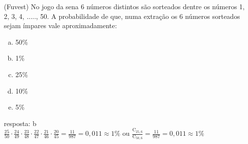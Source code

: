 \begin{ex}
 (Fuvest) No jogo da sena 6 números distintos são sorteados dentre os números 1, 2, 3, 4, ....., 50. A probabilidade de que, numa extração os 6 números sorteados sejam ímpares vale aproximadamente:
    \begin{enumerate}[(a)]
    \item 50\%
    \item 1\%
    \item 25\%
    \item 10\%
    \item 5\%
    \end{enumerate}
     \begin{sol}
      resposta: b \\ 
      $\frac{25}{50}\cdot\frac{24}{49}\cdot\frac{23}{48}\cdot\frac{22}{47}\cdot\frac{21}{46}\cdot\frac{20}{45}=\frac{11}{987}=0,011 \approx 1\%$\hspace{0.2cm}  ou\hspace{0.2cm} 
      $\frac{\mathrm{C}_{{25},6}}{\mathrm{C}_{{50},6}} =\frac{11}{987}= 0,011 \approx 1\% $
     \end{sol}
\end{ex}